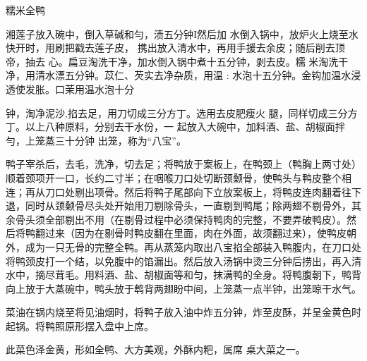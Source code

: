 \begin{recipe}[八宝全鸭]{糯米全鸭}

\ingredients


\cooking

湘莲子放入碗中，倒入草碱和勻，渍五分钟I然后加 水倒入锅中，放炉火上烧至水快开时，用刷把戳去莲子皮， 携出放入清水中，再用手援去余皮；随后削去顶帝，抽去 心。扁豆淘洗干净，加水倒入锅中煮十五分钟，剥去皮。糯 米淘洗干净，用清水漂五分钟。苡仁、芡实去净杂质，用温 : 水泡十五分钟。金钩加温水浸透使发胀。口茉用温水泡十分

钟，淘净泥沙,掐去足，用刀切成三分方丁。选用去皮肥瘦火 腿，同样切成三分方丁。以上八种原料，分别去干水份，一 起放入大碗中，加料酒、盐、胡椒面拌勻，上笼蒸三十分钟 出笼，称为“八宝”。

\step 鸭子宰杀后，去毛，洗净，切去足；将鸭放于案板上，在鸭颈上（鸭胸上两寸处）顺着颈项开一口，长约二寸半；在咽喉刀口处切断颈颡骨，使鸭头与鸭皮整个相连；再从刀口处剔出项骨。然后将鸭子尾部向下立放案板上，将鸭皮连肉翻着往下退，同时从颈颡骨尽头处开始用刀剔除骨头，一直剔到鸭尾；除两翅不剔骨外，其余骨头须全部剔出不用（在剔骨过程中必须保持鸭肉的完整，不要弄破鸭皮）。然后将鸭翻过来（因为在剔骨时鸭皮翻在里面，肉在外面，故须翻过来），使鸭皮朝外，成为一只无骨的完整全鸭。再从蒸笼内取出八宝掐全部装入鸭腹内，在刀口处将鸭颈皮打一个结，以免腹中的馅漏出。然后放入汤锅中烫三分钟后捞出，再入清水中，摘尽茸毛。用料酒、盐、胡椒面等和匀，抹满鸭的全身。将鸭腹朝下，鸭背向上放于大蒸碗中，鸭头放于鹎背两翅盼中间，上笼蒸一点半钟，出笼晾干水气。

\step 菜油在锅内烧至将见油烟时，将鸭子放入油中炸五分钟，炸至皮酥，并呈金黄色时起锅。将鸭照原形摆入盘中上席。

\notes

此菜色泽金黄，形如全鸭、大方美观，外酥内粑，属席 桌大菜之一。

\end{recipe}

